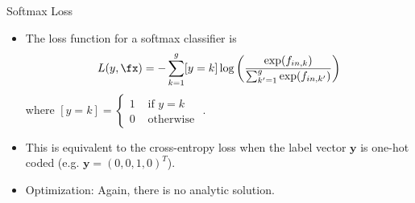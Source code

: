 \begin{frame} {Softmax Loss}
  \begin{itemize}
\vspace{5mm}
\item The loss function for a softmax classifier is
$$L(y, \fx) = - \sum_{k = 1}^g [y = k] \log \left( \frac{\exp(f_{in,k})}{\sum_{k'=1}^g\exp(f_{in,k'})}\right)$$
where $[y = k] = \begin{cases} 1 & \text{ if } y = k \\
0 & \text{ otherwise }
\end{cases}$. 
\vspace{5mm}
\item This is equivalent to the cross-entropy loss when the label vector $\bm{y}$ is one-hot coded (e.g. $\mathbf{y} = (0,0,1,0)^T$). 
\item Optimization:  Again, there is no analytic solution.
\end{itemize}
\end{frame}

\endlecture
